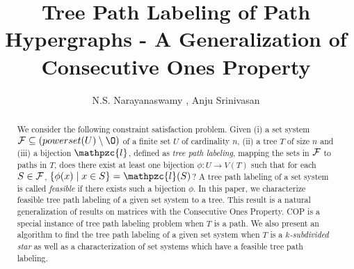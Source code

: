 \documentclass{fsttcs}
\def\cF{{\cal F}}
\def\F{{\mathcal F}}
\def\cl{\mathpzc{l}}
\newcommand{\rcomment}[1]{}
\begin{document}



\title{Tree Path Labeling of Path Hypergraphs - A Generalization of
  Consecutive Ones Property}


\author{N.S. Narayanaswamy , Anju Srinivasan }




\begin{abstract}
  \rcomment{Need to overhaul the abstract}
  We consider the following constraint satisfaction problem. Given (i)
  a
  set system $\F \subseteq (powerset(U) \setminus \O)$ of a finite
  set $U$ of cardinality $n$, (ii) a tree 
  $T$ of size $n$ and (iii) a bijection $\cl$, defined as {\em tree
    path labeling}, mapping the sets in $\cF$ to 
  paths in $T$, does there exist at least one bijection 
  $\phi:U \rightarrow 
   V(T)$ such that for each $S \in \cF$, $\{\phi(x) \mid x \in S\} =
   \cl(S)$?  A tree path labeling of a set system is called {\em
     feasible} if there exists such 
  a bijection $\phi$.  In this paper, we characterize feasible tree
  path labeling of a given set system to a tree.  This result is a
  natural generalization of results on matrices with the Consecutive
  Ones Property. COP is a special instance of tree path labeling
  problem when $T$ is a path.  We also
  present an algorithm to find the tree path labeling of a given
  set system when $T$ is a {\em $k$-subdivided star} as well as a
  characterization of set systems which have a 
  feasible tree path labeling. 
\end{abstract}
\end{document}
